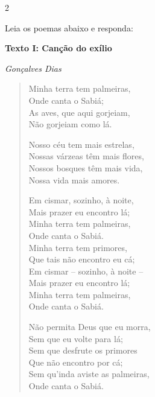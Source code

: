 \num{2}

Leia os poemas abaixo e responda:

\textbf{Texto I: Canção do exílio}

\emph{Gonçalves Dias}

\begin{verse}

Minha terra tem palmeiras, \\

Onde canta o Sabiá; \\

As aves, que aqui gorjeiam, \\

Não gorjeiam como lá. 


Nosso céu tem mais estrelas,\\

Nossas várzeas têm mais flores, \\

Nossos bosques têm mais vida, \\

Nossa vida mais amores.


Em cismar, sozinho, à noite, \\

Mais prazer eu encontro lá; \\

Minha terra tem palmeiras, \\

Onde canta o Sabiá. \\


Minha terra tem primores, \\

Que tais não encontro eu cá; \\

Em cismar -- sozinho, à noite -- \\

Mais prazer eu encontro lá; \\

Minha terra tem palmeiras, \\

Onde canta o Sabiá. 


Não permita Deus que eu morra, \\

Sem que eu volte para lá; \\

Sem que desfrute os primores \\

Que não encontro por cá; \\

Sem qu'inda aviste as palmeiras, \\

Onde canta o Sabiá.

\end{verse}


